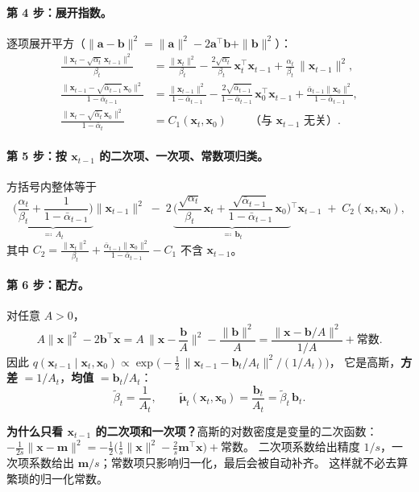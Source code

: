 \documentclass[a4paper,fontset=none,zihao=5]{ctexart}
\numberwithin{equation}{section}
\newcommand{\x}{\mathbf{x}}
\newcommand{\abar}{\bar{\alpha}}
\newcommand{\mut}{\tilde{\boldsymbol{\mu}}}
\newcommand{\btil}{\tilde{\beta}}
\begin{document}
\paragraph{第 4 步：展开指数。}逐项展开平方（$\|\mathbf{a}-\mathbf{b}\|^2=\|\mathbf{a}\|^2-2\mathbf{a}^\top\mathbf{b}+\|\mathbf{b}\|^2$）：
\begin{align}
  \frac{\|\x_t-\sqrt{\alpha_t}\,\x_{t-1}\|^2}{\beta_t}
   &= \frac{\|\x_t\|^2}{\beta_t}-\frac{2\sqrt{\alpha_t}}{\beta_t}\,\x_t^\top\x_{t-1}+\frac{\alpha_t}{\beta_t}\,\|\x_{t-1}\|^2, \\
  \frac{\|\x_{t-1}-\sqrt{\abar_{t-1}}\,\x_0\|^2}{1-\abar_{t-1}}
   &= \frac{\|\x_{t-1}\|^2}{1-\abar_{t-1}}-\frac{2\sqrt{\abar_{t-1}}}{1-\abar_{t-1}}\,\x_0^\top\x_{t-1}+\frac{\abar_{t-1}\|\x_0\|^2}{1-\abar_{t-1}}, \\
  \frac{\|\x_t-\sqrt{\abar_t}\,\x_0\|^2}{1-\abar_t} &= C_1(\x_t,\x_0)\qquad\text{（与 $\x_{t-1}$ 无关）}.
\end{align}

\paragraph{第 5 步：按 $\x_{t-1}$ 的二次项、一次项、常数项归类。}方括号内整体等于
\begin{equation}
  \underbrace{\Big(\frac{\alpha_t}{\beta_t}+\frac{1}{1-\abar_{t-1}}\Big)}_{\eqqcolon\,A_t}\|\x_{t-1}\|^2
  \;-\;2\,\underbrace{\Big(\frac{\sqrt{\alpha_t}}{\beta_t}\,\x_t+\frac{\sqrt{\abar_{t-1}}}{1-\abar_{t-1}}\,\x_0\Big)}_{\eqqcolon\,\mathbf{b}_t}{}^{\!\top}\x_{t-1}
  \;+\;C_2(\x_t,\x_0),
  \label{eq:quad-form}
\end{equation}
其中 $C_2=\frac{\|\x_t\|^2}{\beta_t}+\frac{\abar_{t-1}\|\x_0\|^2}{1-\abar_{t-1}}-C_1$ 不含 $\x_{t-1}$。

\paragraph{第 6 步：配方。}对任意 $A>0$，
\begin{equation}
  A\|\x\|^2-2\mathbf{b}^\top\x
  = A\,\Big\|\x-\frac{\mathbf{b}}{A}\Big\|^2-\frac{\|\mathbf{b}\|^2}{A}
  = \frac{\|\x-\mathbf{b}/A\|^2}{1/A}+\text{常数}.
\end{equation}
因此 $q(\x_{t-1}\mid\x_t,\x_0)\propto\exp\!\big(-\frac12\,\|\x_{t-1}-\mathbf{b}_t/A_t\|^2\big/(1/A_t)\big)$，
它是高斯，\textbf{方差} $=1/A_t$，\textbf{均值} $=\mathbf{b}_t/A_t$：
\begin{equation}
  \btil_t=\frac{1}{A_t},\qquad \mut_t(\x_t,\x_0)=\frac{\mathbf{b}_t}{A_t}=\btil_t\,\mathbf{b}_t .
  \label{eq:read-off}
\end{equation}
\begin{whybox}
\textbf{为什么只看 $\x_{t-1}$ 的二次项和一次项？}高斯的对数密度是变量的二次函数：
$-\frac{1}{2s}\|\x-\mathbf{m}\|^2=-\frac12\big(\frac1s\|\x\|^2-\frac{2}{s}\mathbf{m}^\top\x\big)+\text{常数}$。
二次项系数给出精度 $1/s$，一次项系数给出 $\mathbf{m}/s$；常数项只影响归一化，最后会被自动补齐。
这样就不必去算繁琐的归一化常数。
\end{whybox}
\end{document}

